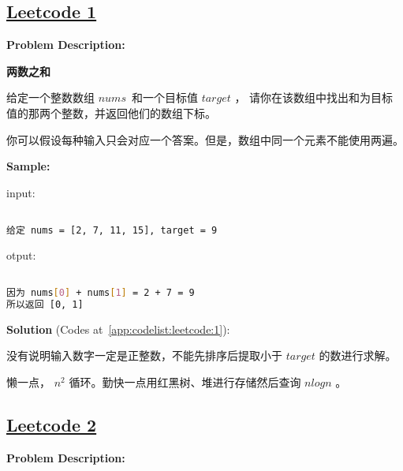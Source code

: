 \subsection{\href{https://leetcode-cn.com/}{Leetcode 1}}\label{app:problemlist:leetcode:1}

\textbf{Problem Description:}\par

\textbf{两数之和}\par

给定一个整数数组 $ nums $ 和一个目标值 $ target $ ，
请你在该数组中找出和为目标值的那两个整数，并返回他们的数组下标。\par

你可以假设每种输入只会对应一个答案。但是，数组中同一个元素不能使用两遍。\par


\textbf{Sample:}\par

input:\par

\begin{lstlisting}[language=bash]

给定 nums = [2, 7, 11, 15], target = 9


\end{lstlisting}

otput:\par

\begin{lstlisting}[language=bash]

因为 nums[0] + nums[1] = 2 + 7 = 9
所以返回 [0, 1]


\end{lstlisting}

\textbf{Solution }(Codes at~\ref{app:codelist:leetcode:1}):\par

没有说明输入数字一定是正整数，不能先排序后提取小于 $ target $ 的数进行求解。\par

懒一点， $ n^{2} $ 循环。勤快一点用红黑树、堆进行存储然后查询 $ nlogn $ 。\par



\subsection{\href{https://leetcode-cn.com/}{Leetcode 2}}\label{app:problemlist:leetcode:2}

\textbf{Problem Description:}\par

